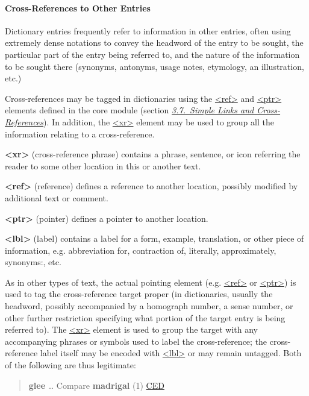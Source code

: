 \paragraph[{Cross-References to Other Entries}]{Cross-References to Other Entries}\label{DITPXR}\par
Dictionary entries frequently refer to information in other entries, often using extremely dense notations to convey the headword of the entry to be sought, the particular part of the entry being referred to, and the nature of the information to be sought there (synonyms, antonyms, usage notes, etymology, an illustration, etc.)\par
Cross-references may be tagged in dictionaries using the \hyperref[TEI.ref]{<ref>} and \hyperref[TEI.ptr]{<ptr>} elements defined in the core module (section \textit{\hyperref[COXR]{3.7.\ Simple Links and Cross-References}}). In addition, the \hyperref[TEI.xr]{<xr>} element may be used to group all the information relating to a cross-reference. 
\begin{sansreflist}
  
\item [\textbf{<xr>}] (cross-reference phrase) contains a phrase, sentence, or icon referring the reader to some other location in this or another text.
\item [\textbf{<ref>}] (reference) defines a reference to another location, possibly modified by additional text or comment.
\item [\textbf{<ptr>}] (pointer) defines a pointer to another location.
\item [\textbf{<lbl>}] (label) contains a label for a form, example, translation, or other piece of information, e.g. abbreviation for, contraction of, literally, approximately, synonyms:, etc.
\end{sansreflist}
\par
As in other types of text, the actual pointing element (e.g. \hyperref[TEI.ref]{<ref>} or \hyperref[TEI.ptr]{<ptr>}) is used to tag the cross-reference target proper (in dictionaries, usually the headword, possibly accompanied by a homograph number, a sense number, or other further restriction specifying what portion of the target entry is being referred to). The \hyperref[TEI.xr]{<xr>} element is used to group the target with any accompanying phrases or symbols used to label the cross-reference; the cross-reference label itself may be encoded with \hyperref[TEI.lbl]{<lbl>} or may remain untagged. Both of the following are thus legitimate: 
\begin{quote}{\bfseries glee} … Compare {\bfseries madrigal} (1) \hyperref[DIC-CED]{CED}\end{quote}
